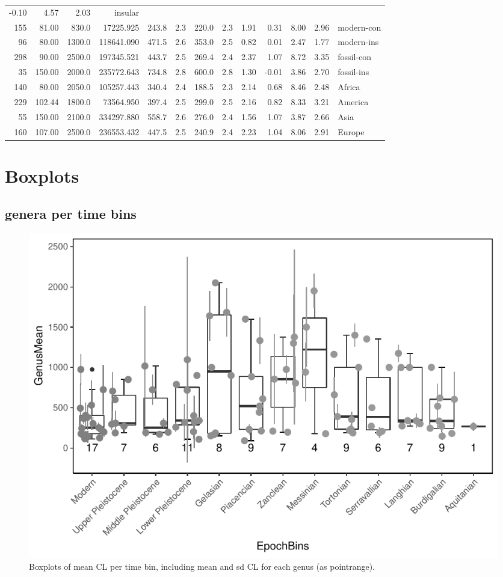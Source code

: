 \documentclass[]{article}
\begin{document}
\begin{longtable}[]{@{}rrrrrrrrrrrrl@{}}
-0.10 & 4.57 & 2.03 & insular\tabularnewline
155 & 81.00 & 830.0 & 17225.925 & 243.8 & 2.3 & 220.0 & 2.3 & 1.91 &
0.31 & 8.00 & 2.96 & modern-con\tabularnewline
96 & 80.00 & 1300.0 & 118641.090 & 471.5 & 2.6 & 353.0 & 2.5 & 0.82 &
0.01 & 2.47 & 1.77 & modern-ins\tabularnewline
298 & 90.00 & 2500.0 & 197345.521 & 443.7 & 2.5 & 269.4 & 2.4 & 2.37 &
1.07 & 8.72 & 3.35 & fossil-con\tabularnewline
35 & 150.00 & 2000.0 & 235772.643 & 734.8 & 2.8 & 600.0 & 2.8 & 1.30 &
-0.01 & 3.86 & 2.70 & fossil-ins\tabularnewline
140 & 80.00 & 2050.0 & 105257.443 & 340.4 & 2.4 & 188.5 & 2.3 & 2.14 &
0.68 & 8.46 & 2.48 & Africa\tabularnewline
229 & 102.44 & 1800.0 & 73564.950 & 397.4 & 2.5 & 299.0 & 2.5 & 2.16 &
0.82 & 8.33 & 3.21 & America\tabularnewline
55 & 150.00 & 2100.0 & 334297.880 & 558.7 & 2.6 & 276.0 & 2.4 & 1.56 &
1.07 & 3.87 & 2.66 & Asia\tabularnewline
160 & 107.00 & 2500.0 & 236553.432 & 447.5 & 2.5 & 240.9 & 2.4 & 2.23 &
1.04 & 8.06 & 2.91 & Europe\tabularnewline
\bottomrule
\end{longtable}

\newpage

\section{Boxplots}\label{boxplots}

\subsection{genera per time bins}\label{genera-per-time-bins}

\begin{figure}[htbp]
\centering
\includegraphics{MA_JJ_files/figure-latex/Boxplots of each genus per time bin-1.pdf}
\caption{Boxplots of mean CL per time bin, including mean and sd CL for
each genus (as pointrange).}
\end{figure}
\end{document}
